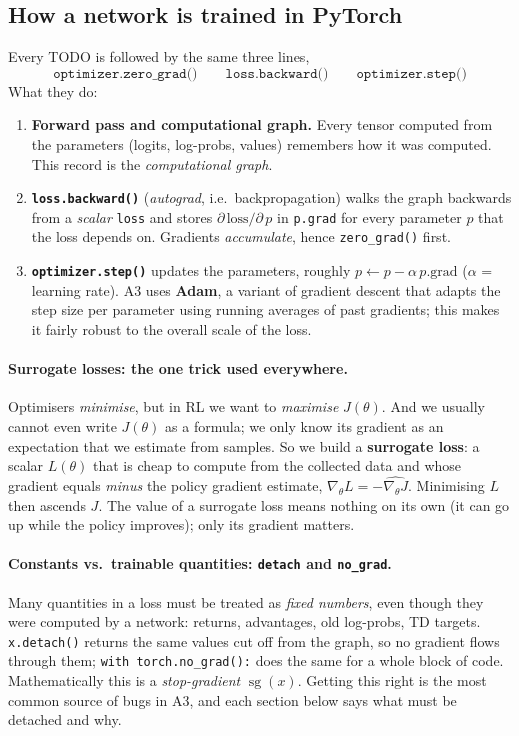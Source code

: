 \documentclass[11pt,a4paper]{article}
\newcommand{\gradt}{\nabla_\theta}
\newcommand{\code}[1]{\texttt{#1}}
\begin{document}
\subsection{How a network is trained in PyTorch}\label{sec:training}
Every TODO is followed by the same three lines,
\[\code{optimizer.zero\_grad()}\qquad \code{loss.backward()}\qquad \code{optimizer.step()}\]
What they do:
\begin{enumerate}[nosep]
  \item \textbf{Forward pass and computational graph.} Every tensor computed from the parameters (logits, log-probs, values) remembers how it was computed. This record is the \emph{computational graph}.
  \item \textbf{\code{loss.backward()}} (\emph{autograd}, i.e.\ backpropagation) walks the graph backwards from a \emph{scalar} \code{loss} and stores $\partial\,\text{loss}/\partial\,p$ in \code{p.grad} for every parameter $p$ that the loss depends on. Gradients \emph{accumulate}, hence \code{zero\_grad()} first.
  \item \textbf{\code{optimizer.step()}} updates the parameters, roughly $p\gets p-\alpha\,p.\text{grad}$ ($\alpha$ = learning rate). A3 uses \textbf{Adam}, a variant of gradient descent that adapts the step size per parameter using running averages of past gradients; this makes it fairly robust to the overall scale of the loss.
\end{enumerate}

\paragraph{Surrogate losses: the one trick used everywhere.}
Optimisers \emph{minimise}, but in RL we want to \emph{maximise} $J(\theta)$. And we usually cannot even write $J(\theta)$ as a formula; we only know its gradient as an expectation that we estimate from samples. So we build a \textbf{surrogate loss}: a scalar $L(\theta)$ that is cheap to compute from the collected data and whose gradient equals \emph{minus} the policy gradient estimate, $\gradt L = -\widehat{\gradt J}$. Minimising $L$ then ascends $J$. The value of a surrogate loss means nothing on its own (it can go up while the policy improves); only its gradient matters.

\paragraph{Constants vs.\ trainable quantities: \code{detach} and \code{no\_grad}.}
Many quantities in a loss must be treated as \emph{fixed numbers}, even though they were computed by a network: returns, advantages, old log-probs, TD targets. \code{x.detach()} returns the same values cut off from the graph, so no gradient flows through them; \code{with torch.no\_grad():} does the same for a whole block of code. Mathematically this is a \emph{stop-gradient} $\operatorname{sg}(x)$. Getting this right is the most common source of bugs in A3, and each section below says what must be detached and why.
\end{document}
